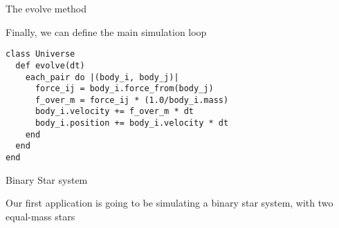 \documentclass[bigger]{beamer}
\begin{document}
\begin{frame}[fragile,label=sec-30]{The evolve method}
 \begin{block}{Finally, we can define the main simulation loop}
\begin{verbatim}
class Universe
  def evolve(dt)
    each_pair do |(body_i, body_j)|
      force_ij = body_i.force_from(body_j)
      f_over_m = force_ij * (1.0/body_i.mass)
      body_i.velocity += f_over_m * dt
      body_i.position += body_i.velocity * dt
    end
  end
end
\end{verbatim}
\end{block}
\end{frame}
\begin{frame}[label=sec-31]{Binary Star system}
\begin{block}{Our first application is going to be simulating a binary star system, with two equal-mass stars}
\end{block}
\end{frame}
\end{document}
